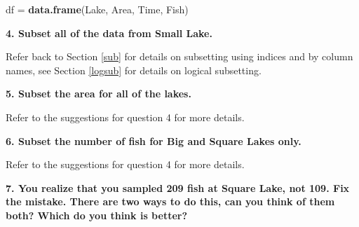 \documentclass[]{book}
\newenvironment{Shaded}{\begin{snugshade}}{\end{snugshade}}
\newcommand{\KeywordTok}[1]{\textcolor[rgb]{0.13,0.29,0.53}{\textbf{#1}}}
\newcommand{\DecValTok}[1]{\textcolor[rgb]{0.00,0.00,0.81}{#1}}
\newcommand{\StringTok}[1]{\textcolor[rgb]{0.31,0.60,0.02}{#1}}
\newcommand{\CommentTok}[1]{\textcolor[rgb]{0.56,0.35,0.01}{\textit{#1}}}
\newcommand{\OperatorTok}[1]{\textcolor[rgb]{0.81,0.36,0.00}{\textbf{#1}}}
\newcommand{\NormalTok}[1]{#1}
\theoremstyle{definition}
\theoremstyle{definition}
\theoremstyle{definition}
\theoremstyle{remark}
\begin{document}
\begin{Shaded}
\begin{Highlighting}[]
\NormalTok{df =}\StringTok{ }\KeywordTok{data.frame}\NormalTok{(Lake, Area, Time, Fish)}
\end{Highlighting}
\end{Shaded}

\textbf{4. Subset all of the data from Small Lake.}

Refer back to Section \ref{sub} for details on subsetting using indices
and by column names, see Section \ref{logsub} for details on logical
subsetting.

\begin{Shaded}
\end{Shaded}

\textbf{5. Subset the area for all of the lakes.}

Refer to the suggestions for question 4 for more details.

\begin{Shaded}
\end{Shaded}

\textbf{6. Subset the number of fish for Big and Square Lakes only.}

Refer to the suggestions for question 4 for more details.

\begin{Shaded}
\end{Shaded}

\textbf{7. You realize that you sampled 209 fish at Square Lake, not
109. Fix the mistake. There are two ways to do this, can you think of
them both? Which do you think is better?}
\end{document}
